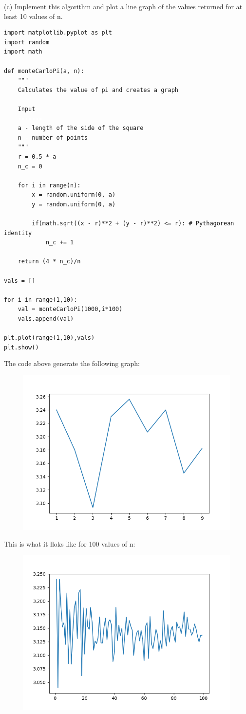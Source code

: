 \documentclass[12pt]{article}
\begin{document}
\noindent
(c) Implement this algorithm and plot a line graph of the values returned for at least 10 values of n.

\begin{verbatim}
import matplotlib.pyplot as plt
import random
import math

def monteCarloPi(a, n):
    """
    Calculates the value of pi and creates a graph

    Input
    -------
    a - length of the side of the square
    n - number of points
    """
    r = 0.5 * a
    n_c = 0

    for i in range(n):
        x = random.uniform(0, a)
        y = random.uniform(0, a)

        if(math.sqrt((x - r)**2 + (y - r)**2) <= r): # Pythagorean identity
            n_c += 1

    return (4 * n_c)/n

vals = []

for i in range(1,10):
    val = monteCarloPi(1000,i*100)
    vals.append(val)

plt.plot(range(1,10),vals)
plt.show()
\end{verbatim}

The code above generate the following graph:

\begin{figure}[H]
\centerline{\includegraphics{Figure_1}}
\end{figure}

This is what it lloks like for 100 values of n:

\begin{figure}[H]
\centerline{\includegraphics{Figure_2}}
\end{figure}
\end{document}

